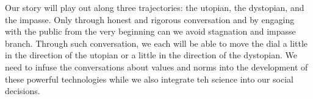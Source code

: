 Our story will play out along three trajectories: the utopian, the dystopian, and the impasse.
Only through honest and rigorous conversation and by engaging with the public from the very beginning can we avoid stagnation and impasse branch.
Through such conversation, we each will be able to move the dial a little in the direction of the utopian or a little in the direction of the dystopian.
We need to infuse the conversations about values and norms into the development of these powerful technologies while we also integrate teh science into our social decisions.
